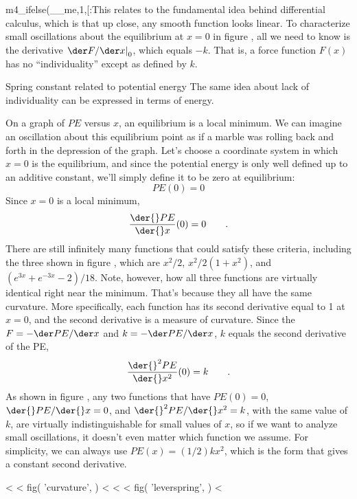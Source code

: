 m4_ifelse(__me,1,[:This relates to the fundamental idea behind differential calculus, which is
that up close, any smooth function looks linear. To characterize small oscillations about
the equilibrium at $x=0$ in figure , all we need to know is 
the derivative $\left.\der F/\der x\right|_{0}$, which equals $-k$.
That is, a force function $F(x)$ has no ``individuality'' except as defined by $k$.

\begin{eg}{Spring constant related to potential energy}
        The same idea about lack of individuality can be expressed in terms of energy.

        On a graph of $PE$ versus $x$, an equilibrium is a local minimum. We can imagine
        an oscillation about this equilibrium point as if a marble was rolling back and forth in the depression of the graph.
        Let's choose a coordinate system in which $x=0$ is the equilibrium, and since the potential energy
        is only well defined up to an additive constant, we'll simply
        define it to be zero at equilibrium:
        \begin{equation*}
                PE(0) = 0
        \end{equation*}
        Since $x=0$ is a local minimum,
        \begin{equation*}
                \frac{\der{}PE}{\der{}x}(0) = 0 \qquad .
        \end{equation*}
        There are still infinitely many functions that could satisfy these criteria,
        including the three shown in figure , which are
        $x^2/2$, $x^2/2(1+x^2)$, and $(e^{3x}+e^{-3x}-2)/18$. Note,
        however, how all three functions are virtually identical right near the
        minimum. That's because they all have the same curvature. More specifically,
        each function has its second derivative equal to 1 at $x=0$, and the second
        derivative is a measure of curvature. Since the $F=-\der PE/\der x$ and $k=-\der PE/\der x$, $k$ equals the second derivative
        of the PE,
        \begin{equation*}
                \frac{\der{}^2 PE}{\der{}x^2}(0) = k \qquad .
        \end{equation*}
        As shown in figure
        , any two functions that have $PE(0)=0$, $\der{}PE/\der{}x=0$, and
        $\der{}^2 PE/\der{}x^2=k$, with the same value of $k$, are virtually indistinguishable
        for small values of $x$, so if we want to analyze small oscillations, it doesn't even
        matter which function we assume. For simplicity, we can always use $PE(x)=(1/2)kx^2$,
        which is the form that gives a constant second derivative.
\end{eg}
<%
<%
  fig(
    'curvature',
  )
<%
<%
<%
  fig(
    'leverspring',
  )
<%

